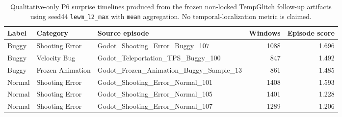 \begin{table}[t]
\centering
\caption{Qualitative-only P6 surprise timelines produced from the frozen non-locked TempGlitch
follow-up artifacts using seed44 \texttt{lewm\_l2\_max} with
\texttt{mean} aggregation. No temporal-localization metric is claimed.}
\label{tab:qualitative-timelines}
\scriptsize
\begin{tabularx}{\textwidth}{@{}l l X r r@{}}
\toprule
Label & Category & Source episode & Windows & Episode score \\
\midrule
Buggy & Shooting Error & Godot\_Shooting\_Error\_Buggy\_107 & 1088 & 1.696 \\
Buggy & Velocity Bug & Godot\_Teleportation\_TPS\_Buggy\_100 & 847 & 1.492 \\
Buggy & Frozen Animation & Godot\_Frozen\_Animation\_Buggy\_Sample\_13 & 861 & 1.485 \\
Normal & Shooting Error & Godot\_Shooting\_Error\_Normal\_101 & 1408 & 1.593 \\
Normal & Shooting Error & Godot\_Shooting\_Error\_Normal\_105 & 1401 & 1.228 \\
Normal & Shooting Error & Godot\_Shooting\_Error\_Normal\_107 & 1289 & 1.206 \\
\bottomrule
\end{tabularx}
\end{table}

